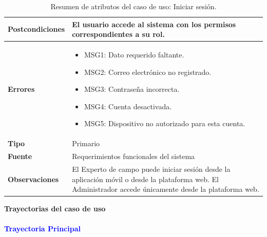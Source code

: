 \begin{table}[H]
\begin{tabular}{|l|p{10cm}|}
\textbf{Postcondiciones} & 
El usuario accede al sistema con los permisos correspondientes a su rol. \\ \hline

\textbf{Errores} & 
\begin{itemize}
    \item MSG1: Dato requerido faltante.
    \item MSG2: Correo electrónico no registrado.
    \item MSG3: Contraseña incorrecta.
    \item MSG4: Cuenta desactivada.
    \item MSG5: Dispositivo no autorizado para esta cuenta.
\end{itemize} \\ \hline

\textbf{Tipo} & Primario \\ \hline

\textbf{Fuente} & Requerimientos funcionales del sistema \\ \hline

\textbf{Observaciones} & 
El Experto de campo puede iniciar sesión desde la aplicación móvil o desde la plataforma web. El Administrador accede únicamente desde la plataforma web. \\ \hline

\end{tabular}
\caption{Resumen de atributos del caso de uso: Iniciar sesión.}
\label{tab:cuG01IniciarSesion}
\end{table}


{\large {\textbf{Trayectorias del caso de uso}}}

\vspace{0.5em}
\paragraph{\textbf{\textcolor{blue}{Trayectoria Principal}}}


